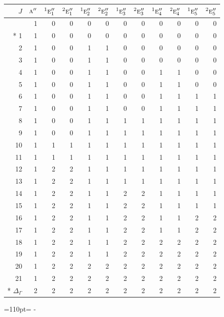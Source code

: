 \documentclass[10pt,a4paper]{article}
\makeatletter
\def\grouprule#1#2{\noalign{\marks\LTgroupmarks{\the\belowrulesep}\nobreak\vskip#1%
  \vskip\aboverulesep}\multispan\LT@cols\unskip{\leaders\hrule\@height#2\hfill\kern\z@}\cr
  \noalign{\penalty\LTrulebreak\vskip\belowrulesep\global\@lastruleclass\z@}}
\newcommand{\needspace}[1]{\par\penalty-100\begingroup\dimen0=#1\relax\dimen2=\pagegoal
  \advance\dimen2-\pagetotal\ifdim\dimen0>\dimen2\relax\ifdim\dimen2>0pt\vfil\break\fi\fi
  \endgroup}
\numberwithin{equation}{section}
\newcommand{\irr}[1]{\text{\normalfont\scshape #1}}
\newcommand{\conjpair}[1]{{}^{#1}}
\makeatother
\begin{document}
{\small\begin{longtable}{@{}rrrrrrrrrrrr@{}}\toprule
$J$ & $\irr{a}''$ & $\conjpair{1}\irr{e}_{1}''$ & $\conjpair{2}\irr{e}_{1}''$ & $\conjpair{1}\irr{e}_{2}''$ & $\conjpair{2}\irr{e}_{2}''$ & $\conjpair{1}\irr{e}_{3}''$ & $\conjpair{2}\irr{e}_{3}''$ & $\conjpair{1}\irr{e}_{4}''$ & $\conjpair{2}\irr{e}_{4}''$ & $\conjpair{1}\irr{e}_{5}''$ & $\conjpair{2}\irr{e}_{5}''$\\\midrule\endhead
\bottomrule\endfoot\endlastfoot
0 & 1 & 0 & 0 & 0 & 0 & 0 & 0 & 0 & 0 & 0 & 0\\*
1 & 1 & 0 & 0 & 0 & 0 & 0 & 0 & 0 & 0 & 0 & 0\\
2 & 1 & 0 & 0 & 1 & 1 & 0 & 0 & 0 & 0 & 0 & 0\\
3 & 1 & 0 & 0 & 1 & 1 & 0 & 0 & 0 & 0 & 0 & 0\\
4 & 1 & 0 & 0 & 1 & 1 & 0 & 0 & 1 & 1 & 0 & 0\\
5 & 1 & 0 & 0 & 1 & 1 & 0 & 0 & 1 & 1 & 0 & 0\\
6 & 1 & 0 & 0 & 1 & 1 & 0 & 0 & 1 & 1 & 1 & 1\\
7 & 1 & 0 & 0 & 1 & 1 & 0 & 0 & 1 & 1 & 1 & 1\\
8 & 1 & 0 & 0 & 1 & 1 & 1 & 1 & 1 & 1 & 1 & 1\\
9 & 1 & 0 & 0 & 1 & 1 & 1 & 1 & 1 & 1 & 1 & 1\\
10 & 1 & 1 & 1 & 1 & 1 & 1 & 1 & 1 & 1 & 1 & 1\\
11 & 1 & 1 & 1 & 1 & 1 & 1 & 1 & 1 & 1 & 1 & 1\\
12 & 1 & 2 & 2 & 1 & 1 & 1 & 1 & 1 & 1 & 1 & 1\\
13 & 1 & 2 & 2 & 1 & 1 & 1 & 1 & 1 & 1 & 1 & 1\\
14 & 1 & 2 & 2 & 1 & 1 & 2 & 2 & 1 & 1 & 1 & 1\\
15 & 1 & 2 & 2 & 1 & 1 & 2 & 2 & 1 & 1 & 1 & 1\\
16 & 1 & 2 & 2 & 1 & 1 & 2 & 2 & 1 & 1 & 2 & 2\\
17 & 1 & 2 & 2 & 1 & 1 & 2 & 2 & 1 & 1 & 2 & 2\\
18 & 1 & 2 & 2 & 1 & 1 & 2 & 2 & 2 & 2 & 2 & 2\\
19 & 1 & 2 & 2 & 1 & 1 & 2 & 2 & 2 & 2 & 2 & 2\\
20 & 1 & 2 & 2 & 2 & 2 & 2 & 2 & 2 & 2 & 2 & 2\\
21 & 1 & 2 & 2 & 2 & 2 & 2 & 2 & 2 & 2 & 2 & 2\\*
\grouprule{0pt}{\lightrulewidth} $\Delta_\Gamma$ & 2 & 2 & 2 & 2 & 2 & 2 & 2 & 2 & 2 & 2 & 2\\
\bottomrule\end{longtable}}
\needspace{110pt}
\end{document}
